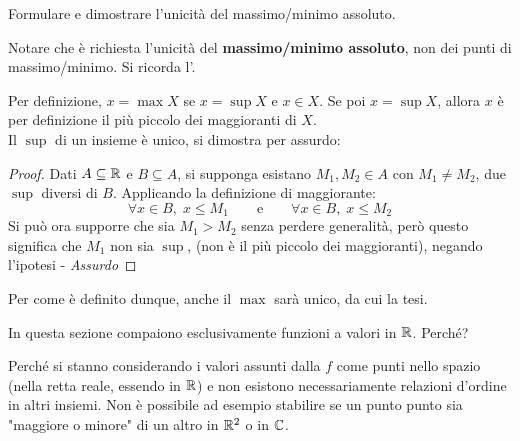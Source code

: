 \begin{exercise}
	\label{ex:uniq_max_min_abs}
	Formulare e dimostrare l'unicità del massimo/minimo assoluto.
	\begin{note}
		Notare che è richiesta l'unicità del \textbf{massimo/minimo assoluto}, non dei punti di massimo/minimo. Si ricorda l'.
	\end{note}
	\begin{solution}
		Per definizione, $x = \max X$ se $x = \sup X$ e $x \in X$. Se poi $x = \sup X$, allora $x$ è per definizione il più piccolo dei maggioranti di $X$.\\
		Il $\sup$ di un insieme è unico, si dimostra per assurdo:
		\begin{proof}
			\renewcommand\qedsymbol{$\square$} %
			Dati $A \subseteq \mathbb{R}$ e $B \subseteq A$, si supponga esistano $M_1, M_2 \in A$ con $M_1 \neq M_2$, due $\sup$ diversi di $B$. Applicando la definizione di maggiorante:
			\[\forall x \in B,\; x \leq M_1 \qquad \text{e} \qquad \forall x \in B,\; x \leq M_2\]
			Si può ora supporre che sia $M_1 > M_2$ senza perdere generalità, però questo significa che $M_1$ non sia $\sup$, (non è il più piccolo dei maggioranti), negando l'ipotesi - \textit{Assurdo}
		\end{proof}
		Per come è definito dunque, anche il $\max$ sarà unico, da cui la tesi.
	\end{solution}
\end{exercise}
\begin{exercise}
	\label{ex:max_min_lib_funz_in_R}
	In questa sezione compaiono esclusivamente funzioni a valori in $\mathbb{R}$. Perché?
	\begin{solution}
		Perché si stanno considerando i valori assunti dalla $f$ come punti nello spazio (nella retta reale, essendo in $\mathbb{R}$) e non esistono necessariamente relazioni d'ordine in altri insiemi. Non è possibile ad esempio stabilire se un punto punto sia "maggiore o minore" di un altro in $\mathbb{R}^2$ o in $\mathbb{C}$.
	\end{solution}
\end{exercise}

